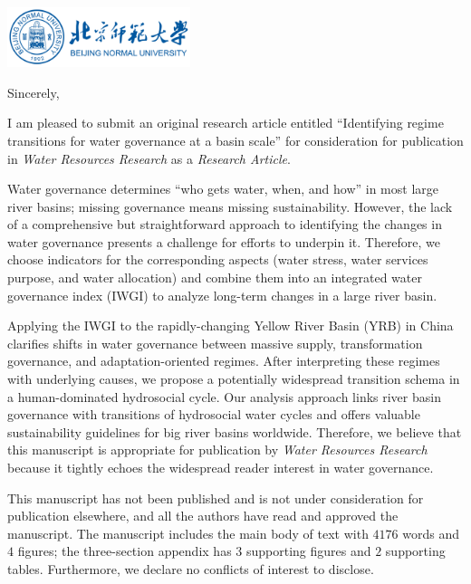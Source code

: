 \documentclass[11pt,a4paper,roman]{moderncv}
\begin{document}
\begin{minipage}[t]{\textwidth}
\includegraphics[width=0.40\textwidth]{bnu}
\end{minipage}


\opening{\vspace*{-2em}}
\closing{Sincerely,}{\vspace*{-2em}}
\makelettertitle

I am pleased to submit an original research article entitled ``Identifying regime transitions for water governance at a basin scale'' for consideration for publication in \textit{Water Resources Research} as a \textit{Research Article}.

Water governance determines ``who gets water, when, and how'' in most large river basins; missing governance means missing sustainability. However, the lack of a comprehensive but straightforward approach to identifying the changes in water governance presents a challenge for efforts to underpin it. Therefore, we choose indicators for the corresponding aspects (water stress, water services purpose, and water allocation) and combine them into an integrated water governance index (IWGI) to analyze long-term changes in a large river basin.

Applying the IWGI to the rapidly-changing Yellow River Basin (YRB) in China clarifies shifts in water governance between massive supply, transformation governance, and adaptation-oriented regimes. After interpreting these regimes with underlying causes, we propose a potentially widespread transition schema in a human-dominated hydrosocial cycle. Our analysis approach links river basin governance with transitions of hydrosocial water cycles and offers valuable sustainability guidelines for big river basins worldwide. Therefore, we believe that this manuscript is appropriate for publication by \textit{Water Resources Research} because it tightly echoes the widespread reader interest in water governance.

This manuscript has not been published and is not under consideration for publication elsewhere, and all the authors have read and approved the manuscript. The manuscript includes the main body of text with $4176$ words and $4$ figures; the three-section appendix has $3$ supporting figures and $2$ supporting tables. Furthermore, we declare no conflicts of interest to disclose.
\end{document}
